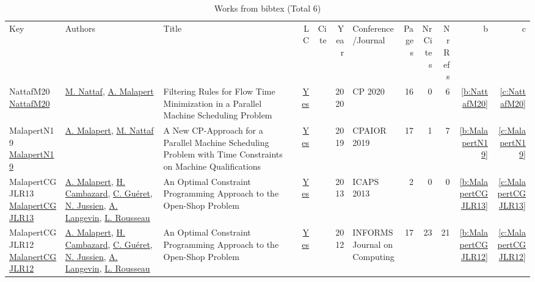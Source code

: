 {\scriptsize
\begin{longtable}{>{\raggedright\arraybackslash}p{3cm}>{\raggedright\arraybackslash}p{6cm}>{\raggedright\arraybackslash}p{6.5cm}rrrp{2.5cm}rrrrr}
\rowcolor{white}\caption{Works from bibtex (Total 6)}\\ \toprule
\rowcolor{white}Key & Authors & Title & LC & Cite & Year & \shortstack{Conference\\/Journal} & Pages & \shortstack{Nr\\Cites} & \shortstack{Nr\\Refs} & b & c \\ \midrule\endhead
\bottomrule
\endfoot
NattafM20 \href{https://doi.org/10.1007/978-3-030-58475-7\_27}{NattafM20} & \hyperref[auth:a81]{M. Nattaf}, \hyperref[auth:a82]{A. Malapert} & Filtering Rules for Flow Time Minimization in a Parallel Machine Scheduling Problem & \href{works/NattafM20.pdf}{Yes} & \cite{NattafM20} & 2020 & CP 2020 & 16 & 0 & 6 & \ref{b:NattafM20} & \ref{c:NattafM20}\\
MalapertN19 \href{https://doi.org/10.1007/978-3-030-19212-9\_28}{MalapertN19} & \hyperref[auth:a82]{A. Malapert}, \hyperref[auth:a81]{M. Nattaf} & A New CP-Approach for a Parallel Machine Scheduling Problem with Time Constraints on Machine Qualifications & \href{works/MalapertN19.pdf}{Yes} & \cite{MalapertN19} & 2019 & CPAIOR 2019 & 17 & 1 & 7 & \ref{b:MalapertN19} & \ref{c:MalapertN19}\\
MalapertCGJLR13 \href{http://www.aaai.org/ocs/index.php/ICAPS/ICAPS13/paper/view/6016}{MalapertCGJLR13} & \hyperref[auth:a82]{A. Malapert}, \hyperref[auth:a1025]{H. Cambazard}, \hyperref[auth:a296]{C. Gu{\'{e}}ret}, \hyperref[auth:a250]{N. Jussien}, \hyperref[auth:a655]{A. Langevin}, \hyperref[auth:a332]{L. Rousseau} & An Optimal Constraint Programming Approach to the Open-Shop Problem & \href{works/MalapertCGJLR13.pdf}{Yes} & \cite{MalapertCGJLR13} & 2013 & ICAPS 2013 & 2 & 0 & 0 & \ref{b:MalapertCGJLR13} & \ref{c:MalapertCGJLR13}\\
MalapertCGJLR12 \href{https://doi.org/10.1287/ijoc.1100.0446}{MalapertCGJLR12} & \hyperref[auth:a82]{A. Malapert}, \hyperref[auth:a1025]{H. Cambazard}, \hyperref[auth:a296]{C. Gu{\'{e}}ret}, \hyperref[auth:a250]{N. Jussien}, \hyperref[auth:a655]{A. Langevin}, \hyperref[auth:a332]{L. Rousseau} & An Optimal Constraint Programming Approach to the Open-Shop Problem & \href{works/MalapertCGJLR12.pdf}{Yes} & \cite{MalapertCGJLR12} & 2012 & INFORMS Journal on Computing & 17 & 23 & 21 & \ref{b:MalapertCGJLR12} & \ref{c:MalapertCGJLR12}\\

\end{longtable}}
